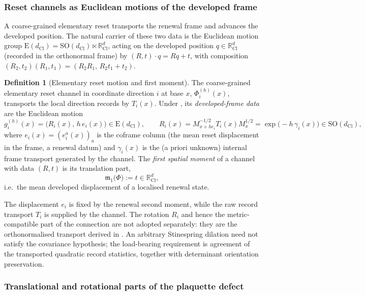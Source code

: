 \documentclass[11pt]{article}
\theoremstyle{definition}
\newtheorem{definition}[theorem]{Definition}
\theoremstyle{remark}
\newcommand{\R}{\mathbb{R}}
\newcommand{\dCl}{d_{\mathrm{Cl}}}
\newcommand{\mone}{\mathfrak{m}_1}
\newcommand{\Eucl}{\mathrm{E}(\dCl)}
\newcommand{\SO}{\mathrm{SO}}
\begin{document}
\subsubsection{Reset channels as Euclidean motions of the developed frame}

A coarse-grained elementary reset transports the renewal frame and advances the
developed position.  The natural carrier of these two data is the Euclidean
motion group $\Eucl=\SO(\dCl)\ltimes\R^\dCl$, acting on the developed
position $q\in\R^\dCl$ (recorded in the orthonormal frame) by
$(R,t)\cdot q=Rq+t$, with composition $(R_2,t_2)(R_1,t_1)=(R_2R_1,\,R_2t_1+t_2)$.

\begin{definition}[Elementary reset motion and first moment]
\label{def:reset-motion}
The coarse-grained elementary reset channel in coordinate direction $i$ at base
$x$, $\Phi_i^{(h)}(x)$, transports the local direction records by
\(T_i(x)\).  Under , its
\emph{developed-frame data} are the Euclidean motion
\[
  g_i^{(h)}(x)=\bigl(R_i(x),\,h\,e_i(x)\bigr)\in\Eucl,
  \qquad
  R_i(x)=M_{x+he_i}^{-1/2}T_i(x)M_x^{1/2}
        =\exp\!\bigl(-h\,\gamma_i(x)\bigr)\in\SO(\dCl),
\]
where $e_i(x)=(e^a_i(x))_a$ is the coframe column \textup{(}the mean reset
displacement in the frame, a renewal datum\textup{)} and $\gamma_i(x)$ is the
\textup{(}a priori unknown\textup{)} internal frame transport generated by the
channel.  The \emph{first spatial moment} of a channel with data $(R,t)$ is its
translation part,
\[
  \mone\bigl(\Phi\bigr):=t\in\R^\dCl,
\]
i.e.\ the mean developed displacement of a localised renewal state.
\end{definition}

The displacement \(e_i\) is fixed by the renewal second moment, while the raw
record transport \(T_i\) is supplied by the channel.  The rotation \(R_i\) and
hence the metric-compatible part of the connection are not adopted separately:
they are the orthonormalised transport derived in
.  An arbitrary Stinespring dilation need not
satisfy the covariance hypothesis; the load-bearing requirement is agreement of
the transported quadratic record statistics, together with determinant
orientation preservation.

\subsubsection{Translational and rotational parts of the plaquette defect}
\end{document}
